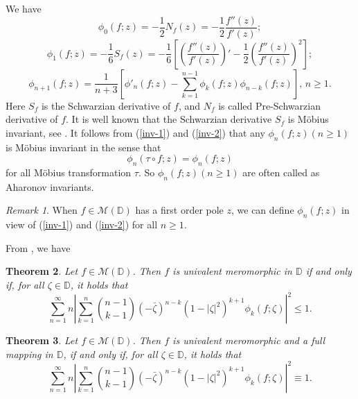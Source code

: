 \documentclass[10pt]{amsart}
\newtheorem{theorem}{Theorem}[section]
\theoremstyle{definition}
\theoremstyle{remark}
\newtheorem{remark}[theorem]{Remark}
\numberwithin{equation}{section}
\begin{document}
We have
\begin{equation} 
\phi_0(f; z)=-\frac{1}{2}N_f(z)=-\frac{1}{2}\frac{f''(z)}{f'(z)};\nonumber
\end{equation}
\begin{equation}\label{inv-1}
\phi_1(f; z)=-\frac{1}{6}S_f(z)=-\frac{1}{6}\left[\left(\frac{f''(z)}{f'(z)}\right)'-\frac{1}{2}\left(\frac{f''(z)}{f'(z)}\right)^2\right];
\end{equation}
\begin{equation}\label{inv-2}
\phi_{n+1}(f; z)=\frac{1}{n+3}\left[\phi'_{n}(f; z)-\sum_{k=1}^{n-1}\phi_{k}(f; z)\phi_{n-k}(f; z)\right],\, n\geq 1.
\end{equation}
Here $S_f$ is the Schwarzian derivative of $f$, and $N_f$ is called Pre-Schwarzian derivative of $f$. It is well known that the Schwarzian derivative $S_f$ is M\"obius invariant, see \cite[Chapter II]{L}.  It follows from (\ref{inv-1}) and (\ref{inv-2}) that any $\phi_n(f; z)(n\geq 1)$ is  M\"obius invariant in the sense that 
$$\phi_n(\tau \circ f; z)= \phi_n(f; z)$$
for all M\"obius transformation $\tau$. So $\phi_n(f; z)(n\geq 1)$ are often called as Aharonov invariants.

\begin{remark}
When $f\in \mathcal{M}(\mathbb{D})$ has a first order pole $z$,  we can define  $\phi_n(f; z)$ in view of  (\ref{inv-1}) and (\ref{inv-2}) for all $n \geq 1$.
\end{remark}

From \cite{Ah}, we have 
\begin{theorem}\label{ah-1}
Let $f\in \mathcal{M}(\mathbb{D})$. Then $f$ is univalent meromorphic in $\mathbb{D}$ if and only if, for all $\zeta\in \mathbb{D}$, it holds that
\begin{equation}\label{a-1}
\sum_{n=1}^{\infty}n\left|\sum_{k=1}^n \binom{n-1}{k-1} (-\bar{\zeta})^{n-k}(1-|\zeta|^2)^{k+1}\phi_k(f; \zeta)\right|^2\leq 1.
\end{equation}
\end{theorem}

\begin{theorem}\label{ah-2}
Let $f\in \mathcal{M}(\mathbb{D})$. Then $f$ is univalent meromorphic and a full mapping in $\mathbb{D}$, if and only if,  for all $\zeta\in \mathbb{D}$, it holds that
\begin{equation}
\sum_{n=1}^{\infty}n\left|\sum_{k=1}^n \binom{n-1}{k-1} (-\bar{\zeta})^{n-k}(1-|\zeta|^2)^{k+1}\phi_k(f; \zeta)\right|^2 \equiv 1. \nonumber
\end{equation}
\end{theorem}
\end{document}
